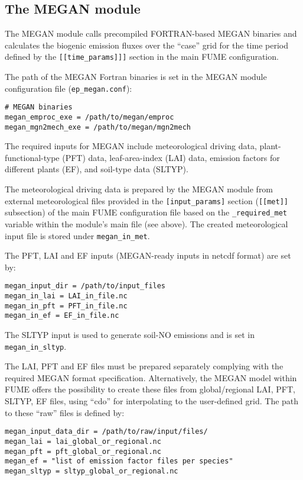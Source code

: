 \documentclass[a4paper,11pt]{article}
\begin{document}
\subsection{The MEGAN module}
The MEGAN module calls precompiled FORTRAN-based MEGAN binaries and calculates the biogenic emission fluxes over the ``case'' grid for the time period defined by the \verb|[[time_params]]]| section in the main FUME configuration. 

The path of the MEGAN Fortran binaries is set in the MEGAN module configuration file (\verb|ep_megan.conf|):
\begin{verbatim}
# MEGAN binaries
megan_emproc_exe = /path/to/megan/emproc
megan_mgn2mech_exe = /path/to/megan/mgn2mech
\end{verbatim}

The required inputs for MEGAN include meteorological driving data, plant-functional-type (PFT) data, leaf-area-index (LAI) data, emission factors for different plants (EF), and soil-type data (SLTYP).

The meteorological driving data is prepared by the MEGAN module from external meteorological files provided in the \verb|[input_params]| section (\verb|[[met]]| subsection) of the main FUME configuration file based on the 
\verb|_required_met| variable within the module's main file (see above). The created meteorological input file is stored under \verb|megan_in_met|.

The PFT, LAI and EF inputs (MEGAN-ready inputs in netcdf format) are set by:
\begin{verbatim}
megan_input_dir = /path/to/input_files
megan_in_lai = LAI_in_file.nc
megan_in_pft = PFT_in_file.nc
megan_in_ef = EF_in_file.nc
\end{verbatim}

The SLTYP input is used to generate soil-NO emissions and is set in \verb|megan_in_sltyp|.

The LAI, PFT and EF files must be prepared separately complying with the required MEGAN format specification. Alternatively, the MEGAN model within FUME offers the possibility to create these files from global/regional LAI, PFT, SLTYP, EF files, using ``cdo'' for interpolating to the user-defined grid. The path to these ``raw'' files is defined by:
\begin{verbatim}
megan_input_data_dir = /path/to/raw/input/files/
megan_lai = lai_global_or_regional.nc
megan_pft = pft_global_or_regional.nc
megan_ef = "list of emission factor files per species"
megan_sltyp = sltyp_global_or_regional.nc
\end{verbatim}
\end{document}
